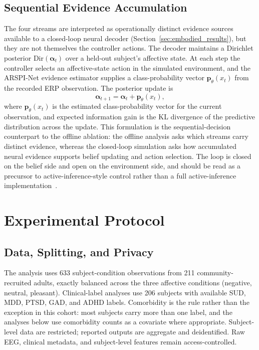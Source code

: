 \documentclass[journal]{IEEEtran}
\begin{document}
\subsection{Sequential Evidence Accumulation}
The four streams are interpreted as operationally distinct evidence sources available to a closed-loop neural decoder (Section~\ref{sec:embodied_results}), but they are not themselves the controller actions. The decoder maintains a Dirichlet posterior $\mathrm{Dir}(\boldsymbol{\alpha}_t)$ over a held-out subject's affective state. At each step the controller selects an affective-state action in the simulated environment, and the ARSPI-Net evidence estimator supplies a class-probability vector $\mathbf{p}_{\theta}(x_t)$ from the recorded ERP observation. The posterior update is
\begin{equation}
\boldsymbol{\alpha}_{t+1} = \boldsymbol{\alpha}_t + \mathbf{p}_{\theta}(x_t),
\label{eq:dirichlet_update}
\end{equation}
where $\mathbf{p}_{\theta}(x_t)$ is the estimated class-probability vector for the current observation, and expected information gain is the KL divergence of the predictive distribution across the update. This formulation is the sequential-decision counterpart to the offline ablation: the offline analysis asks which streams carry distinct evidence, whereas the closed-loop simulation asks how accumulated neural evidence supports belief updating and action selection. The loop is closed on the belief side and open on the environment side, and should be read as a precursor to active-inference-style control rather than a full active-inference implementation~\cite{friston2010free,parr2022activeinference}.

\section{Experimental Protocol}
\subsection{Data, Splitting, and Privacy}
The analysis uses 633 subject-condition observations from 211 community-recruited adults, exactly balanced across the three affective conditions (negative, neutral, pleasant). Clinical-label analyses use 206 subjects with available SUD, MDD, PTSD, GAD, and ADHD labels. Comorbidity is the rule rather than the exception in this cohort: most subjects carry more than one label, and the analyses below use comorbidity counts as a covariate where appropriate. Subject-level data are restricted; reported outputs are aggregate and deidentified. Raw EEG, clinical metadata, and subject-level features remain access-controlled.
\end{document}
